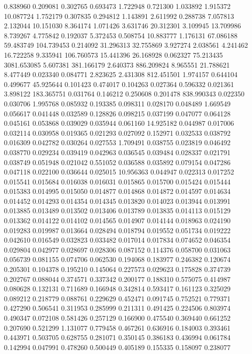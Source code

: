 0.838960
0.209081
0.302765
0.693473
1.722948
0.721300
1.033892
1.915372
10.087724
1.752179
0.307835
0.294812
1.143891
2.611992
0.288738
7.057813
2.132044
10.151030
8.364174
1.071426
3.631746
20.312301
3.109945
13.709986
8.739267
4.775842
0.192037
5.372453
0.508754
10.883777
1.176131
67.086188
59.483749
104.739453
0.214092
31.296313
32.755869
3.927274
2.038561
4.241462
16.722258
9.335941
106.760573
15.441396
26.168928
0.062327
75.213435
3081.653085
5.607381
381.166179
2.640373
886.209824
8.965551
21.788621
8.477449
0.023340
0.084771
2.823625
2.431308
812.451501
1.974157
0.644104
0.499677
45.925644
0.101423
0.474017
0.104263
0.027364
0.596332
0.021361
3.898122
183.365751
0.031764
0.146212
0.250608
0.201478
838.990343
0.022350
0.030706
1.995768
0.085932
0.193385
0.098311
0.028170
0.048489
1.669549
0.056617
0.041448
0.032589
0.128826
0.098215
0.037199
0.047077
0.064128
0.045161
0.053868
0.039029
0.035944
0.061160
14.925182
0.044987
0.017006
0.032114
0.030958
0.019365
0.021293
0.027092
0.152971
0.032533
0.038792
0.016309
0.042782
0.030264
0.027553
1.709491
0.038755
0.023819
0.046492
0.038770
0.029234
0.039419
0.042963
0.036545
0.039484
0.028337
0.021791
0.038749
0.051948
0.021042
0.551052
0.036588
0.035892
0.079154
0.047286
0.047118
0.022100
0.036644
0.025015
10.956363
0.044947
0.022313
0.017252
0.015541
0.015684
0.016038
0.016031
0.015865
0.015700
0.015424
0.015444
0.015383
0.014995
0.015050
0.014877
0.014868
0.014872
0.014597
0.014634
0.014452
0.014293
0.014354
0.014345
0.013820
0.014023
0.013944
0.013991
0.013885
0.013489
0.013502
0.013406
0.013789
0.013835
0.014113
0.015129
0.013362
0.014122
0.014102
0.014565
0.014907
0.014144
0.018963
0.024190
0.019283
0.019987
0.013664
0.028494
0.018794
0.019552
0.051734
0.019222
0.042610
0.016549
0.032823
0.033482
0.017014
0.017834
0.074652
0.046354
0.029804
0.042977
0.028697
0.028306
0.087152
0.114376
0.058700
0.031063
0.056739
0.081155
0.074706
0.062530
0.194068
0.183977
0.246382
0.120674
0.205301
0.104378
0.195210
0.145064
0.227573
0.029623
0.175828
0.374739
0.202767
0.088044
0.374571
0.337342
0.200177
0.188310
0.575075
0.414987
0.080628
0.132131
0.711689
0.166948
0.342814
0.593417
0.161123
0.325029
0.089212
0.218779
0.088761
0.229629
0.452471
0.091745
0.752521
0.779371
0.427290
0.506541
0.311953
0.285999
0.211311
0.491425
0.224506
0.803974
0.490347
0.072108
0.581426
0.257129
0.166900
0.475540
0.369440
0.661252
0.207690
0.521299
1.131077
0.779458
0.467261
0.636916
0.184003
0.393461
0.443971
0.503705
0.628755
0.281071
0.350145
0.386183
0.436994
0.061784
0.142994
0.047991
0.478260
0.500449
0.405189
0.155335
0.158097
0.238077
